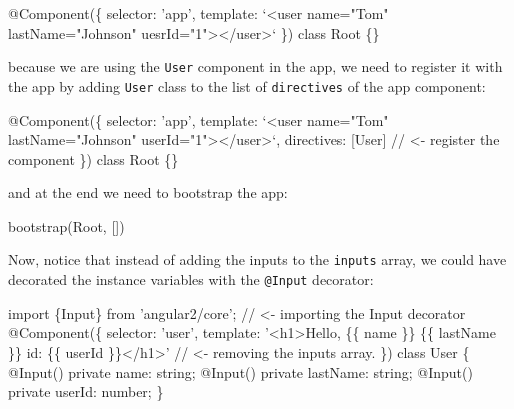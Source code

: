 \documentclass[12pt,]{article}
\newenvironment{Shaded}{}{}
\newcommand{\KeywordTok}[1]{\textcolor[rgb]{0.00,0.00,1.00}{{#1}}}
\newcommand{\StringTok}[1]{\textcolor[rgb]{0.00,0.50,0.50}{{#1}}}
\newcommand{\CommentTok}[1]{\textcolor[rgb]{0.00,0.50,0.00}{{#1}}}
\newcommand{\FunctionTok}[1]{{#1}}
\newcommand{\NormalTok}[1]{{#1}}
\begin{document}
\begin{Shaded}
\begin{Highlighting}[numbers=left,,]
\FunctionTok{@Component}\NormalTok{(\{}
  \NormalTok{selector: 'app',}
  \NormalTok{template: `<user name=}\StringTok{"Tom"} \NormalTok{lastName=}\StringTok{"Johnson"} \NormalTok{uesrId=}\StringTok{"1"}\NormalTok{></user>`}
\NormalTok{\})}
\KeywordTok{class} \NormalTok{Root \{\}}
\end{Highlighting}
\end{Shaded}

because we are using the \texttt{User} component in the app, we need to
register it with the app by adding \texttt{User} class to the list of
\texttt{directives} of the app component:

\begin{Shaded}
\begin{Highlighting}[numbers=left,,]
\FunctionTok{@Component}\NormalTok{(\{}
  \NormalTok{selector: 'app',}
  \NormalTok{template: `<user name=}\StringTok{"Tom"} \NormalTok{lastName=}\StringTok{"Johnson"} \NormalTok{userId=}\StringTok{"1"}\NormalTok{></user>`,}
  \NormalTok{directives: [User] }\CommentTok{// <- register the component}
\NormalTok{\})}
\KeywordTok{class} \NormalTok{Root \{\}}
\end{Highlighting}
\end{Shaded}

and at the end we need to bootstrap the app:

\begin{Shaded}
\begin{Highlighting}[numbers=left,,]
\FunctionTok{bootstrap}\NormalTok{(Root, [])}
\end{Highlighting}
\end{Shaded}

Now, notice that instead of adding the inputs to the \texttt{inputs}
array, we could have decorated the instance variables with the
\texttt{@Input} decorator:

\begin{Shaded}
\begin{Highlighting}[numbers=left,,]
\KeywordTok{import \{Input\} from 'angular2/core';} \CommentTok{// <- importing the Input decorator}
\FunctionTok{@Component}\NormalTok{(\{}
  \NormalTok{selector: 'user',}
  \NormalTok{template: '<h1>Hello, \{\{ name \}\} \{\{ lastName \}\} id: \{\{ userId \}\}</h1>'}
  \CommentTok{// <- removing the inputs array.}
\NormalTok{\})}
\KeywordTok{class} \NormalTok{User \{}
  \FunctionTok{@Input}\NormalTok{() }\KeywordTok{private} \NormalTok{name: string;}
  \FunctionTok{@Input}\NormalTok{() }\KeywordTok{private} \NormalTok{lastName: string;}
  \FunctionTok{@Input}\NormalTok{() }\KeywordTok{private} \NormalTok{userId: number;}
\NormalTok{\}}
\end{Highlighting}
\end{Shaded}
\end{document}
